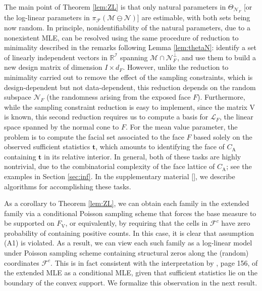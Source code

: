 \documentclass[aos,MSNbibl,nameyear,dvips]{arximspdf}
\newcommand{\m}[1]{\mathrm{#1}}
\begin{document}
The main point of Theorem \ref{lem:ZL} is that only natural parameters
in $\Theta_{\mathcal{N}_F}$ [or the log-linear parameters in
$\pi_{\mathcal{F}}  ( \mathcal{M} \ominus\mathcal{N}   )$] are
estimable, with both sets being now random. In principle,
nonidentifiability of the natural parameters, due to a nonexistent MLE,
can be resolved using the same procedure of reduction to minimality
described in the remarks following Lemma \ref{lem:thetaN}: identify a
set of linearly independent vectors in $\mathbb{R}^{\mathcal{I}}$
spanning $\mathcal{M} \cap \mathcal{N}^\bot_F$, and use them to build a
new design matrix of dimension $I \times d_F$. However, unlike the
reduction to minimality carried out to remove the effect of the
sampling constraints, which is design-dependent but not data-dependent,
this reduction depends on the random subspace $\mathcal{N}_F$ (the
randomness arising from the exposed face $F$). Furthermore, while the
sampling constraint reduction is easy to implement, since the matrix
$\m{V}$ is known, this second reduction requires us to compute a basis
for $\mathcal{L}_F$, the linear space spanned by the normal cone to
$F$. For the mean value parameter, the problem is to compute the facial
set associated to the face $F$ based solely on the observed sufficient
statistics $\mathbf{t}$, which amounts to identifying the face of
$C_{\m{A}}$ containing $\mathbf{t}$ in its relative interior. In
general, both of these tasks are highly nontrivial, due to the
combinatorial complexity of the face lattice of $C_{\m{A}}$; see the
examples in Section \ref{sec:inf}. In the supplementary material
[\citet{FRsupp}], we describe algorithms for accomplishing these tasks.

As a corollary to Theorem \ref{lem:ZL}, we can obtain each family in
the extended family via a conditional Poisson sampling scheme that
forces the base measure to be supported on $F_{\m{V}}$, or
equivalently, by requiring that the cells in $\mathcal{F}^c$ have zero
probability of containing positive counts. In this case, it is clear
that assumption (A1) is violated. As a result, we can view each such
family as a log-linear model under Poisson sampling scheme containing
structural zeros along the (random) coordinates $\mathcal{F}^c$. This
is in fact consistent with the interpretation by \citet{BARN78}, page
156, of the extended MLE as a conditional MLE, given that sufficient
statistics lie on the boundary of the convex support. We formalize this
observation in the next result.
\end{document}
